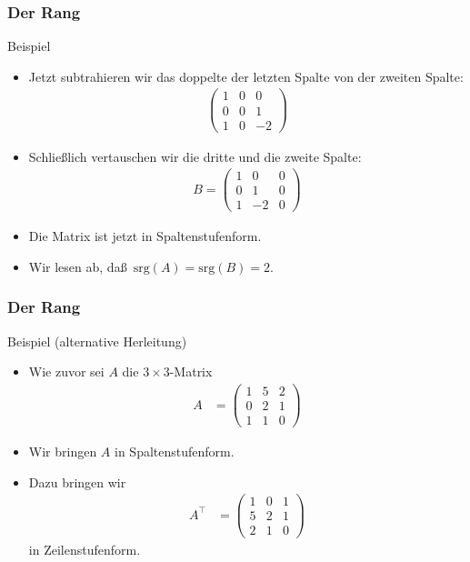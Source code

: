 \documentclass{beamer}
\newcommand{\trans}{\top}
\newcommand{\crk}{\mathrm{srg}}
\newcommand{\mytitle}{Der Rang}
\begin{document}
\begin{frame}\frametitle{\mytitle}
	\begin{block}{Beispiel}
	\begin{itemize}
		\item Jetzt subtrahieren wir das doppelte der letzten Spalte von der zweiten Spalte:
			\begin{align*}
				\begin{pmatrix} 1&0&0\\0&0&1\\1&0&-2 \end{pmatrix}
			\end{align*}
		\item Schlie\ss lich vertauschen wir die dritte und die zweite Spalte:
			\begin{align*}
				B=\begin{pmatrix} 1&0&0\\0&1&0\\1&-2&0 \end{pmatrix}
			\end{align*}
		\item Die Matrix ist jetzt in Spaltenstufenform.
		\item Wir lesen ab, da\ss\ $\crk(A)=\crk(B)=2$.
	\end{itemize}
	\end{block}
\end{frame}

\begin{frame}\frametitle{\mytitle}
	\begin{block}{Beispiel (alternative Herleitung)}
	\begin{itemize}
		\item Wie zuvor sei $A$ die $3\times 3$-Matrix 
			\begin{align*}
				A&=\begin{pmatrix} 1&5&2\\0&2&1\\1&1&0 \end{pmatrix}
			\end{align*}
		\item Wir bringen $A$ in Spaltenstufenform.
		\item Dazu bringen wir
\begin{align*} 
	A^\trans&=\begin{pmatrix} 1&0&1\\ 5&2&1\\ 2&1&0 \end{pmatrix}
			\end{align*}
		in Zeilenstufenform.
	\end{itemize}
	\end{block}
\end{frame}
\end{document}
